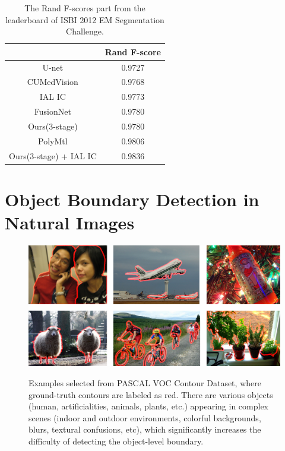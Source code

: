 \documentclass[senior]{IPSstyle}
\begin{document}
\begin{table}[t]
\renewcommand{\arraystretch}{0.8}
\caption{The Rand F-scores part from the leaderboard of ISBI 2012 EM Segmentation Challenge\cite{Ronneberger2015}.}
\label{outcome}
\begin{center}
\begin{tabular}{|c|c|}
\hline
&\multicolumn{1}{c|}{Rand F-score}\\
\hline
U-net\cite{Ronneberger2015} 			& 0.9727	\\	\hline
CUMedVision\cite{Chen2016} 			& 0.9768 	\\	\hline
IAL IC\cite{Beier2016}			& 0.9773	 \\	\hline
FusionNet\cite{Quan2016} 			& 0.9780	\\	\hline
Ours(3-stage) 			& 0.9780	\\	\hline
PolyMtl\cite{Drozdzal2017} 			& 0.9806	\\	\hline
Ours(3-stage) + IAL IC			& 0.9836	\\	\hline
\end{tabular}
\end{center}
\label{isbi12 fscore}
\end{table}



\section{Object Boundary Detection in Natural Images}

\begin{figure}[t]
  \centering
  \includegraphics[width=15cm]{voc_contour.png}\\
  \caption{Examples selected from PASCAL VOC Contour Dataset\cite{Yang2016}, where ground-truth contours are labeled as red. There are various objects (human, artificialities, animals, plants, etc.) appearing in complex scenes (indoor and outdoor environments, colorful backgrounds, blurs, textural confusions, etc), which significantly increases the difficulty of detecting the object-level boundary.}\label{voc contour}
\end{figure}
\end{document}
